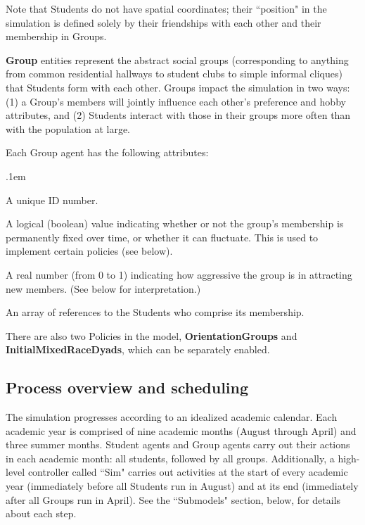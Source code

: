 Note that Students do not have spatial coordinates; their ``position" in the
simulation is defined solely by their friendships with each other and their
membership in Groups.

\vspace{.2in}

\textbf{Group} entities represent the abstract social groups (corresponding to
anything from common residential hallways to student clubs to simple informal
cliques) that Students form with each other. Groups impact the simulation in
two ways: (1) a Group's members will jointly influence each other's preference
and hobby attributes, and (2) Students interact with those in their groups
more often than with the population at large.

\vspace{.1in}
Each Group agent has the following attributes:

\begin{description}
\itemsep.1em

\item[ID] A unique ID number.

\item[IsFixed] A logical (boolean) value indicating whether or not the
group's membership is permanently fixed over time, or whether it can
fluctuate. This is used to implement certain policies (see below).

\item[RecruitmentFactor] A real number (from 0 to 1) indicating how
aggressive the group is in attracting new members. (See below for
interpretation.)

\item[Members] An array of references to the Students who comprise its
membership.

\end{description}

There are also two Policies in the model, \textbf{OrientationGroups} and
\textbf{InitialMixedRaceDyads}, which can be separately enabled.




\subsection{Process overview and scheduling}

The simulation progresses according to an idealized academic calendar. Each
academic year is comprised of nine academic months (August through April) and
three summer months. Student agents and Group agents carry out their actions
in each academic month: all students, followed by all groups. Additionally, a
high-level controller called ``Sim" carries out activities at the start of
every academic year (immediately before all Students run in August) and at its
end (immediately after all Groups run in April). See the ``Submodels" section,
below, for details about each step.

